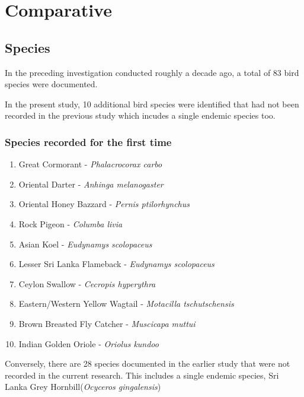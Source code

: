 \chapter{Comparative}
\label{cp:Comparative}
\section{Species}
In the preceding investigation conducted roughly a decade ago, a total of 83 bird species were documented. 

In the present study, 10 additional bird species were identified that had not been recorded in the previous study which incudes a single endemic species too. 

\begin{importantbox}
\subsection{Species recorded for the first time}
\begin{enumerate}
    \item Great Cormorant - \textit{Phalacrocorax carbo}
    \item Oriental Darter - \textit{Anhinga melanogaster}
    \item Oriental Honey Bazzard - \textit{Pernis ptilorhynchus}
    \item Rock Pigeon - \textit{Columba livia}
    \item Asian Koel - \textit{Eudynamys scolopaceus}
    \item Lesser Sri Lanka Flameback - \textit{Eudynamys scolopaceus}
    \item Ceylon Swallow - \textit{Cecropis hyperythra}
    \item Eastern/Western Yellow Wagtail - \textit{Motacilla tschutschensis}
    \item Brown Breasted Fly Catcher - \textit{Muscicapa muttui}
    \item Indian Golden Oriole - \textit{Oriolus kundoo}
\end{enumerate}
\end{importantbox}

Conversely, there are 28 species documented in the earlier study that were not recorded in the current research. This includes a single endemic species, Sri Lanka Grey Hornbill(\textit{Ocyceros gingalensis})
